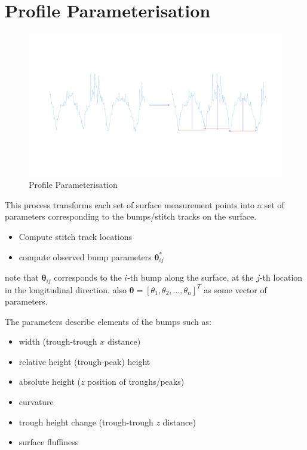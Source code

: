 \documentclass[12pt]{report}
\begin{document}
    \section{Profile Parameterisation}
        \begin{figure}
            \centering
            \includegraphics[width=\textwidth,trim={0 5cm 0 5cm},clip]{figures/profile_measure/temp_parameterise.pdf}
            \caption{Profile Parameterisation}
        \end{figure}
        This process transforms each set of surface measurement points into a set of parameters corresponding to the bumps/stitch tracks on the surface.
        
        \begin{itemize}
            \item Compute stitch track locations 
            \item compute observed bump parameters $\pmb{\theta}^*_{ij}$
        \end{itemize}
        
        note that $\pmb{\theta}_{ij}$ corresponds to the $i$-th bump along the surface, at the $j$-th location in the longitudinal direction. also $\pmb{\theta} = [\theta_1,\theta_2,\ldots ,\theta_n]^T$ as some vector of parameters.
        
        The parameters describe elements of the bumps such as:
        \begin{itemize}
            \item width (trough-trough $x$ distance)
            \item relative height (trough-peak) height
            \item absolute height ($z$ position of troughs/peaks)
            \item curvature
            \item trough height change (trough-trough $z$ distance)
            \item surface fluffiness
        \end{itemize}
         
\end{document}
